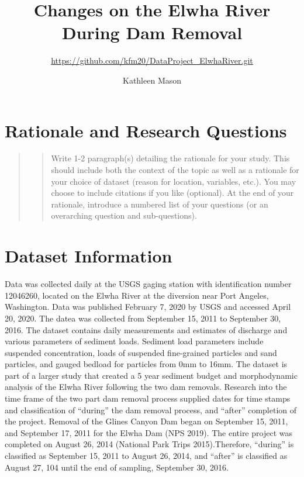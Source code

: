 \documentclass[12pt,]{article}
\title{Changes on the Elwha River During Dam Removal}
\subtitle{\url{https://github.com/kfm20/DataProject_ElwhaRiver.git}}
\author{Kathleen Mason}
\date{}
\begin{document}
\maketitle

\newpage
\tableofcontents 
\newpage
\listoftables 
\newpage
\listoffigures 
\newpage

\hypertarget{rationale-and-research-questions}{%
\section{Rationale and Research
Questions}\label{rationale-and-research-questions}}

\begin{quote}
\begin{quote}
Write 1-2 paragraph(s) detailing the rationale for your study. This
should include both the context of the topic as well as a rationale for
your choice of dataset (reason for location, variables, etc.). You may
choose to include citations if you like (optional). At the end of your
rationale, introduce a numbered list of your questions (or an
overarching question and sub-questions).
\end{quote}
\end{quote}

\newpage

\hypertarget{dataset-information}{%
\section{Dataset Information}\label{dataset-information}}

Data was collected daily at the USGS gaging station with identification
number 12046260, located on the Elwha River at the diversion near Port
Angeles, Washington. Data was published February 7, 2020 by USGS and
accessed April 20, 2020. The datea was collected from September 15, 2011
to September 30, 2016. The dataset contains daily measurements and
estimates of discharge and various parameters of sediment loads.
Sediment load parameters include suspended concentration, loads of
suspended fine-grained particles and sand particles, and gauged bedload
for particles from 0mm to 16mm. The dataset is part of a larger study
that created a 5 year sediment budget and morphodynamic analysis of the
Elwha River following the two dam removals. Research into the time frame
of the two part dam removal process supplied dates for time stamps and
classification of ``during'' the dam removal process, and ``after''
completion of the project. Removal of the Glines Canyon Dam began on
September 15, 2011, and September 17, 2011 for the Elwha Dam (NPS 2019).
The entire project was completed on August 26, 2014 (National Park Trips
2015).Therefore, ``during'' is classified as September 15, 2011 to
August 26, 2014, and ``after'' is classified as August 27, 104 until the
end of sampling, September 30, 2016.
\end{document}
